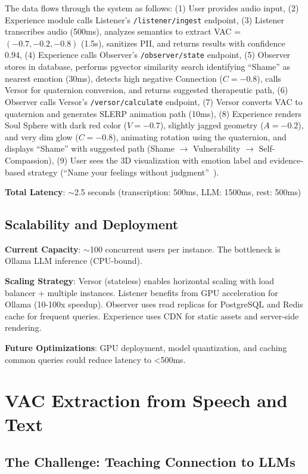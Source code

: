 \documentclass[10pt,twocolumn]{article}
\begin{document}
The data flows through the system as follows: (1) User provides audio input, (2) Experience module calls Listener's \texttt{/listener/ingest} endpoint, (3) Listener transcribes audio (500ms), analyzes semantics to extract VAC = $(-0.7, -0.2, -0.8)$ (1.5s), sanitizes PII, and returns results with confidence 0.94, (4) Experience calls Observer's \texttt{/observer/state} endpoint, (5) Observer stores in database, performs pgvector similarity search identifying ``Shame'' as nearest emotion (30ms), detects high negative Connection ($C = -0.8$), calls Versor for quaternion conversion, and returns suggested therapeutic path, (6) Observer calls Versor's \texttt{/versor/calculate} endpoint, (7) Versor converts VAC to quaternion and generates SLERP animation path (10ms), (8) Experience renders Soul Sphere with dark red color ($V = -0.7$), slightly jagged geometry ($A = -0.2$), and very dim glow ($C = -0.8$), animating rotation using the quaternion, and displays ``Shame'' with suggested path (Shame $\rightarrow$ Vulnerability $\rightarrow$ Self-Compassion), (9) User sees the 3D visualization with emotion label and evidence-based strategy (``Name your feelings without judgment''~\cite{linehan2015}).

\textbf{Total Latency}: $\sim$2.5 seconds (transcription: 500ms, LLM: 1500ms, rest: 500ms)

\subsection{Scalability and Deployment}

\textbf{Current Capacity}: $\sim$100 concurrent users per instance. The bottleneck is Ollama LLM inference (CPU-bound).

\textbf{Scaling Strategy}: Versor (stateless) enables horizontal scaling with load balancer + multiple instances. Listener benefits from GPU acceleration for Ollama (10-100x speedup). Observer uses read replicas for PostgreSQL and Redis cache for frequent queries. Experience uses CDN for static assets and server-side rendering.

\textbf{Future Optimizations}: GPU deployment, model quantization, and caching common queries could reduce latency to <500ms.

\section{VAC Extraction from Speech and Text}
\label{sec:vac-extraction}
\subsection{The Challenge: Teaching Connection to LLMs}
\end{document}
